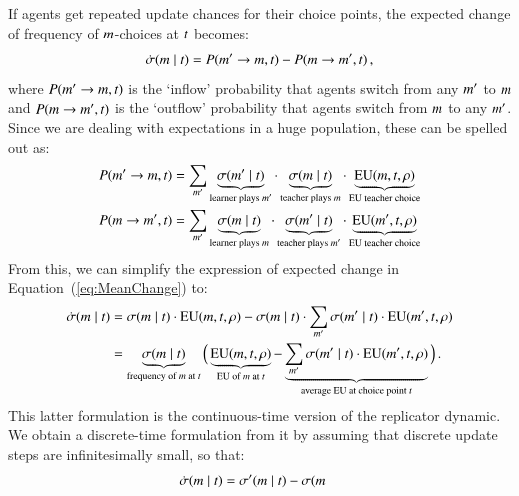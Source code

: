 \documentclass[12pt,english]{article}
\numberwithin{equation}{section}
\begin{document}
\begin{appendices}
If agents get repeated update chances for their choice points, the expected change of
frequency of $m$-choices at $t$ becomes:
\begin{align}
  \label{eq:MeanChange}
  \dot{\sigma}(m \mid t) = P(m' \rightarrow m, t) - P(m \rightarrow m', t)\,,
\end{align}
where $P(m' \rightarrow m, t)$ is the `inflow' probability that agents switch from
any $m'$ to $m$ and $P(m \rightarrow m', t)$ is the `outflow' probability
that agents switch from $m$ to any $m'$. Since we are dealing with expectations in a
huge population, these can be spelled out as:
\begin{align*}
  P(m' \rightarrow m, t) & = \sum_{m'} \underbrace{\sigma(m' \mid
    t)}_{\text{learner plays $m'$}} \cdot
  \underbrace{\sigma(m \mid t)}_{\text{teacher plays $m$}} \cdot
  \underbrace{\mathrm{EU}(m, t, \rho)}_{\text{EU teacher choice}} \\
  P(m \rightarrow m', t) & = \sum_{m'} \underbrace{\sigma(m \mid
    t)}_{\text{learner plays $m$}} \cdot
  \underbrace{\sigma(m' \mid t)}_{\text{teacher plays $m'$}} \cdot
  \underbrace{\mathrm{EU}(m', t, \rho)}_{\text{EU teacher choice}}
\end{align*}
From this, we can simplify the expression of expected change in Equation~(\ref{eq:MeanChange})
to:
\begin{align*}
  \dot{\sigma}(m \mid t) & = \sigma(m \mid t) \cdot \mathrm{EU}(m,
  t, \rho) - \sigma(m \mid t) \cdot  \sum_{m'}
      \sigma(m' \mid t) \cdot \mathrm{EU}(m',t,\rho) \\
& = \underbrace{\sigma(m \mid
    t)}_{\text{frequency of $m$ at $t$}}  \Big ( \underbrace{\mathrm{EU}(m,
  t, \rho)}_{\text{EU of $m$ at $t$}} -   \underbrace{\sum_{m'}
      \sigma(m' \mid t) \cdot \mathrm{EU}(m',t,\rho)}_{\text{average
      EU at choice point $t$}} \Big )\,.
\end{align*}
This latter formulation is the continuous-time version of the replicator dynamic. We obtain a
discrete-time formulation from it by assuming that discrete update steps are infinitesimally
small, so that:
 \begin{align*}
    \dot{\sigma}(\messg \probbar \state) & = \sigma'(\messg \probbar \state) - \sigma(\messg

\end{align*}
\end{appendices}
\end{document}
